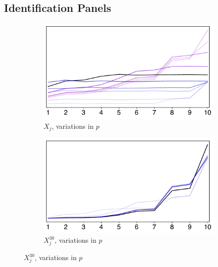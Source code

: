 \documentclass[../main.tex]{subfiles}
\begin{document}
\newpage

\subsection{Identification Panels}
\label{sec:id}


\begin{figure}[H]
    \centering

    \begin{subfigure}[b]{0.39\linewidth}
        \centering
        \includegraphics[width=\linewidth]{p_id1.pdf}
        \vspace{-0.6cm}
        \caption{$X_j$, variations in $p$}
        \label{fig:p1}
    \end{subfigure}
    \hspace{0.07\linewidth}  %
    \begin{subfigure}[b]{0.39\linewidth}
        \centering
        \includegraphics[width=\linewidth]{p_id2.pdf}
        \vspace{-0.6cm}
        \caption{$X_j^{30}$, variations in $p$}
        \label{fig:p2}
    \end{subfigure}


\end{figure}
\end{document}
